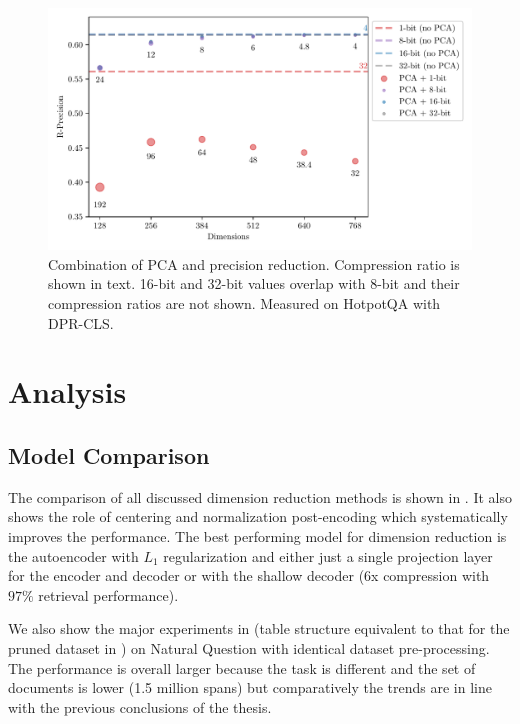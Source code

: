 \begin{figure}[ht]
\center
\includegraphics[width=1\linewidth]{img/prec_pca_mult.pdf}
\caption{Combination of PCA and precision reduction. Compression ratio is shown in text.
16-bit and 32-bit values overlap with 8-bit and their compression ratios are not shown. Measured on HotpotQA with DPR-CLS.}
\label{fig:prec_pca_mult}
\end{figure}



\clearpage

\section{Analysis} \label{sec:analysis}

\subsection{Model Comparison} \label{subsec:model_comparison}

The comparison of all discussed dimension reduction methods is shown in .
It also shows the role of centering and normalization post-encoding which systematically improves the performance.
The best performing model for dimension reduction is the autoencoder with $L_1$ regularization and either just a single projection layer for the encoder and decoder or with the shallow decoder (6x compression with $97\%$ retrieval performance).

We also show the major experiments in  (table structure equivalent to that for the pruned dataset in ) on Natural Question \citep{kwiatkowski2019natural} with identical dataset pre-processing.
The performance is overall larger because the task is different and the set of documents is lower (1.5 million spans) but comparatively the trends are in line with the previous conclusions of the thesis.

